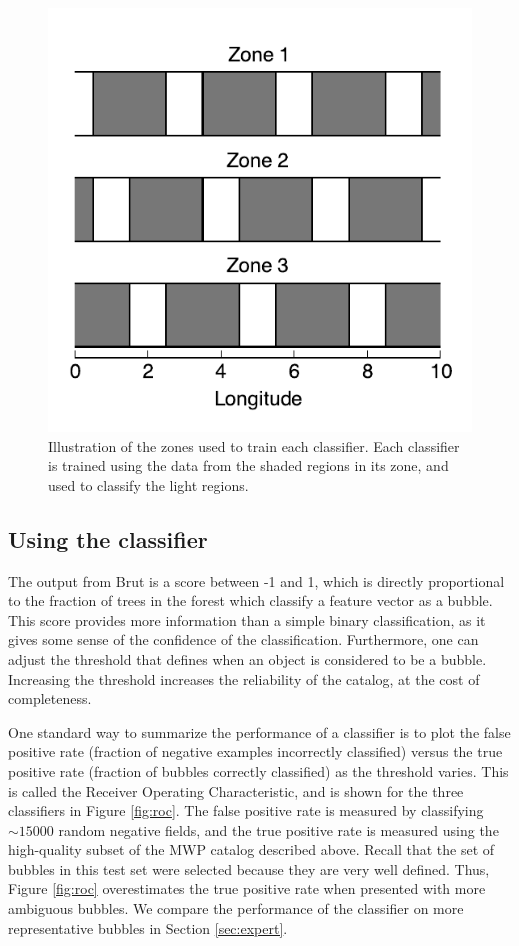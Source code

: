 \begin{figure}[h!]
\includegraphics{zones}
\caption{Illustration of the zones used to train each classifier. Each classifier is trained using the data from the shaded regions in its zone, and used to classify the light regions.}
\label{fig:zone}
\end{figure}

\subsection{Using the classifier}

The output from Brut is a score between -1 and 1, which is directly proportional to the fraction of trees in the forest which classify a feature vector as a bubble. This score provides more information than a simple binary classification, as it gives some sense of the confidence of the classification. Furthermore, one can adjust the threshold that defines when an object is considered to be a bubble. Increasing the threshold increases the reliability of the catalog, at the cost of completeness.

One standard way to summarize the performance of a classifier is to plot the false positive rate (fraction of negative examples incorrectly classified) versus the true positive rate (fraction of bubbles correctly classified) as the threshold varies. This is called the Receiver Operating Characteristic, and is shown for the three classifiers in Figure \ref{fig:roc}. The false positive rate is measured by classifying $\sim 15000$ random negative fields, and the true positive rate is measured using the high-quality subset of the MWP catalog described above. Recall that the set of bubbles in this test set were selected because they are very well defined. Thus, Figure \ref{fig:roc} overestimates the true positive rate when presented with more ambiguous bubbles. We compare the performance of the classifier on more representative bubbles in Section \ref{sec:expert}.

